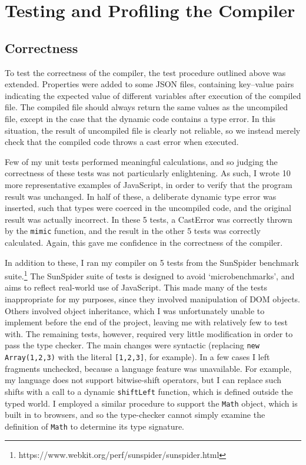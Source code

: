 \documentclass[12pt,a4paper,twoside,openright]{report}
\theoremstyle{definition}
\theoremstyle{dotless}
\newcommand*{\js}{\texttt}
\begin{document}
\section{Testing and Profiling the Compiler}

\subsection*{Correctness}

To test the correctness of the compiler, the test procedure outlined above was
extended. Properties were added to some JSON files, containing
key--value pairs indicating the expected value of different variables after
execution of the compiled file. The compiled file should always return the same
values as the uncompiled file, except in the case that the dynamic code
contains a type error. In this situation, the result of
uncompiled file is clearly not reliable, so we instead merely check that the
compiled code throws a cast error when executed.

Few of my unit tests performed meaningful calculations, and so judging the
correctness of these tests was not particularly enlightening. As such, I wrote
10 more representative examples of JavaScript, in order to verify that the
program result was unchanged. In half of these, a deliberate dynamic type error
was inserted, such that types were coerced in the uncompiled code, and the
original result was actually incorrect. In these 5 tests, a CastError was
correctly thrown by the \texttt{mimic} function, and the result in the other 5
tests was correctly calculated. Again, this gave me confidence in the correctness
of the compiler.

In addition to these, I ran my compiler on 5 tests from the SunSpider benchmark
suite.\footnote{https://www.webkit.org/perf/sunspider/sunspider.html} The
SunSpider suite of tests is designed to avoid `microbenchmarks', and aims to
reflect real-world use of JavaScript. This made many of the tests 
inappropriate for my purposes, since they involved manipulation of DOM objects.
Others involved object inheritance, which I was unfortunately unable to
implement before the end of the project, leaving me with relatively few to test
with. The remaining tests, however, required very little modification in order
to pass the type checker. The main
changes were syntactic (replacing \js{new Array(1,2,3)} with the literal
\js{[1,2,3]}, for example). In a few cases I left fragments unchecked, because
a language feature was unavailable. For example, my language does not
support bitwise-shift operators, but I can replace such shifts with a call to a
dynamic \js{shiftLeft} function, which is defined outside the typed world. I
employed a similar procedure to support the \js{Math} object, which is built in
to browsers, and so the type-checker cannot simply examine the definition of
\js{Math} to determine its type signature.
\end{document}
